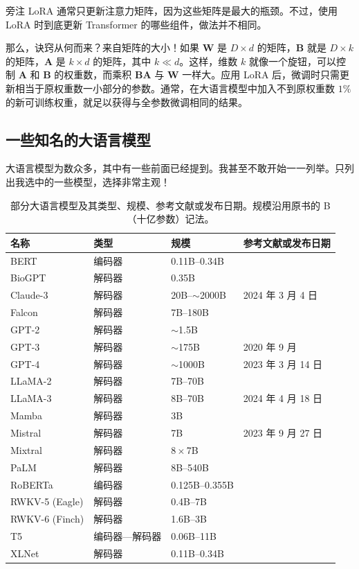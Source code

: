 \begin{booknote}{旁注}
LoRA 通常只更新注意力矩阵，因为这些矩阵是最大的瓶颈。不过，使用 LoRA 时到底更新 Transformer 的哪些组件，做法并不相同。
\end{booknote}

那么，诀窍从何而来？来自矩阵的大小！如果 $\mathbf{W}$ 是 $D\times d$ 的矩阵，$\mathbf{B}$ 就是 $D\times k$ 的矩阵，$\mathbf{A}$ 是 $k\times d$ 的矩阵，其中 $k\ll d$。这样，维数 $k$ 就像一个旋钮，可以控制 $\mathbf{A}$ 和 $\mathbf{B}$ 的权重数，而乘积 $\mathbf{B}\mathbf{A}$ 与 $\mathbf{W}$ 一样大。应用 LoRA 后，微调时只需更新相当于原权重数一小部分的参数。通常，在大语言模型中加入不到原权重数 $1\%$ 的新可训练权重，就足以获得与全参数微调相同的结果。

\subsection{一些知名的大语言模型}
大语言模型为数众多，其中有一些前面已经提到。我甚至不敢开始一一列举。只列出我选中的一些模型，选择非常主观！

\begin{table}[htbp]
\caption{部分大语言模型及其类型、规模、参考文献或发布日期。规模沿用原书的 B（十亿参数）记法。}
\label{tab:11-02}
\centering\footnotesize
\begin{tabularx}{\linewidth}{@{}L{8.3em}L{6.6em}L{6.9em}Y@{}}
\toprule
名称 & 类型 & 规模 & 参考文献或发布日期\\
\midrule
BERT & 编码器 & 0.11B–0.34B & \\
BioGPT & 解码器 & 0.35B & \\
Claude-3 & 解码器 & 20B–$\sim$2000B & 2024 年 3 月 4 日\\
Falcon & 解码器 & 7B–180B & \\
GPT-2 & 解码器 & $\sim$1.5B & \\
GPT-3 & 解码器 & $\sim$175B & 2020 年 9 月\\
GPT-4 & 解码器 & $\sim$1000B & 2023 年 3 月 14 日\\
LLaMA-2 & 解码器 & 7B–70B & \\
LLaMA-3 & 解码器 & 8B–70B & 2024 年 4 月 18 日\\
Mamba & 解码器 & 3B & \\
Mistral & 解码器 & 7B & 2023 年 9 月 27 日\\
Mixtral & 解码器 & $8\times$7B & \\
PaLM & 解码器 & 8B–540B & \\
RoBERTa & 编码器 & 0.125B–0.355B & \\
RWKV-5 (Eagle) & 解码器 & 0.4B–7B & \\
RWKV-6 (Finch) & 解码器 & 1.6B–3B & \\
T5 & 编码器—解码器 & 0.06B–11B & \\
XLNet & 解码器 & 0.11B–0.34B & \\
\bottomrule
\end{tabularx}
\end{table}

